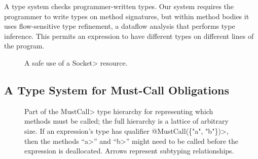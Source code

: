 A type system checks programmer-written types.  Our system requires the
programmer to write types on method signatures, but within method bodies it
uses flow-sensitive type refinement, a dataflow analysis that performs type
inference.  This permits an expression to have different types on different
lines of the program.


\begin{figure}
  
  \prefigcaption
  \caption{A safe use of a \<Socket> resource.}
  \label{fig:example}
\end{figure}

\subsection{A Type System for Must-Call Obligations}
\label{sec:must-call}

\begin{figure}

\caption{Part of the \<MustCall> type hierarchy for representing which methods must be
  called; the full hierarchy is a
  lattice of arbitrary size.
  If an expression's type has qualifier \<@Must\-Call(\{"a", "b"\})>, then
  the methods ``\<a>'' and ``\<b>'' might need to be called before the
  expression is deallocated.
  Arrows represent
  subtyping relationships.
}
\label{fig:must-call-hierarchy}
\end{figure}

